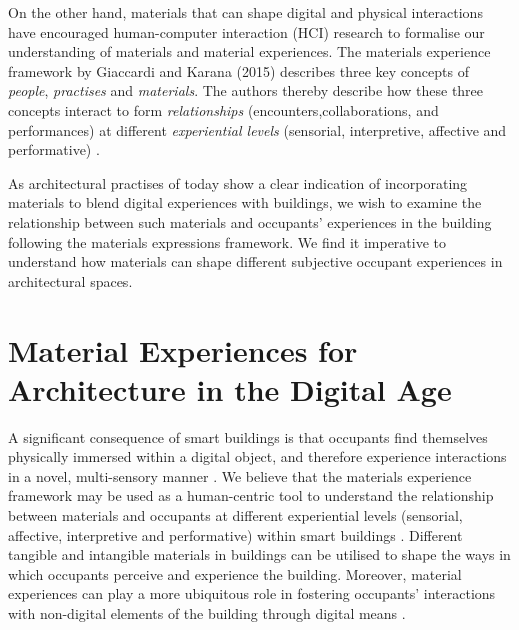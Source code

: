 \documentclass[manuscript, anonymous, review]{acmart}
\begin{document}
On the other hand, materials that can shape digital and physical interactions have encouraged human-computer interaction (HCI) research to formalise our understanding of materials and material experiences. The materials experience framework by Giaccardi and Karana (2015) describes three key concepts of \textit{people}, \textit{practises} and \textit{materials}. The authors thereby describe how these three concepts interact to form \textit{relationships}  (encounters,collaborations, and performances) at different \textit{experiential levels} (sensorial, interpretive, affective and performative) \cite{giaccardi2015foundations}. 

As architectural practises of today show a clear indication of incorporating materials to blend digital experiences with buildings, we wish to examine the relationship between such materials and occupants' experiences in the building following the materials expressions framework. We find it imperative to understand how materials can shape different subjective occupant experiences in architectural spaces.





\section{Material Experiences for Architecture in the Digital Age}

A significant consequence of smart buildings is that occupants find themselves physically immersed within a digital object, and therefore experience interactions in a novel, multi-sensory manner \cite{nembrini2017human}. We believe that the materials experience framework may be used as a human-centric tool to understand the relationship between materials and occupants at different experiential levels (sensorial, affective, interpretive and performative) within smart buildings \cite{giaccardi2015foundations}. Different tangible and intangible materials in buildings can be utilised to shape the ways in which occupants perceive and experience the building. Moreover, material experiences can play a more ubiquitous role in fostering occupants' interactions with non-digital elements of the building through digital means \cite{nembrini2017human}. 
\end{document}
